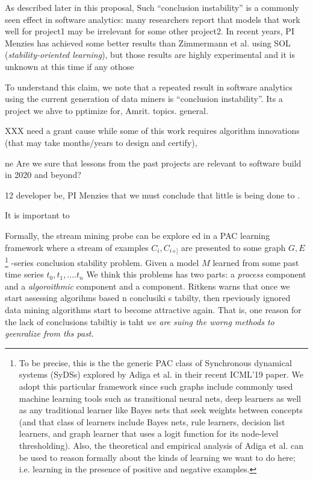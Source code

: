 As described later in this proposal, Such ``conclusion instability'' is a commonly seen effect in software analytics: many researchers report that models that work well for project1 may be irrelevant for some other project2. In recent years,
PI  Menzies has  achieved some better results than Zimmermann et al. using SOL ({\em stability-oriented learning}), but those results are highly experimental and it is unknown at this time if any othose 

To understand this claim, we note that 
a repeated result in software analytics using the current generation of data miners is ``conclusion instability''. Its a project we ahve to pptimize for, Amrit. topics. general.

XXX need a grant cause while some of this work requires algorithm innovations (that may take months/years to design and certify),
 
 
 ne
 Are we sure that lessons from the past projects are relevant to software build in 2020 and beyond?
 
  12 developer be, PI Menzies that  we must conclude that   little is   being done to . 

It is important to


 

Formally, the stream mining probe can be explore ed
in a PAC learning framework where a  stream 
of examples $C_i,C_{i+]}$ are presented to some graph $G,E$\footnote{To
be precise, this is the the generic PAC class of Synchronous dynamical systems (SyDSs)
explored by Adiga et al. in their recent ICML'19 paper. We adopt this particular
framework since
 such graphs include commonly used machine learning tools
such as transitional neural nets, deep learners as well as any traditional
learner like Bayes nets that seek weights between concepts (and that class
of learners include Bayes nets, rule learners, decision list learners, and graph learner that uses a logit function for its node-level thresholding). Also, the   theoretical and empirical analysis of Adiga et al. can be used
to reason formally about the kinds of learning we want to do here; i.e.
learning in the presence of positive and negative examples.}
-series conclusion stability problem.
Given a model $M$ learned from some past time series $t_0,t_1,....t_n$
We think this problems has two parts: a
{\em process} component and a
{\em algoroithmic} component and a
 component.
 Ritkens warns that once we start assessing algorihms based n conclusiki s tabilty, then rpeviously ignored data mining algorithms start to become attractive again. That is,
 one reason for the lack of conclusions tabiltiy is taht {\em we are suing the worng methods
 to geenralize from ths past}. 
 

